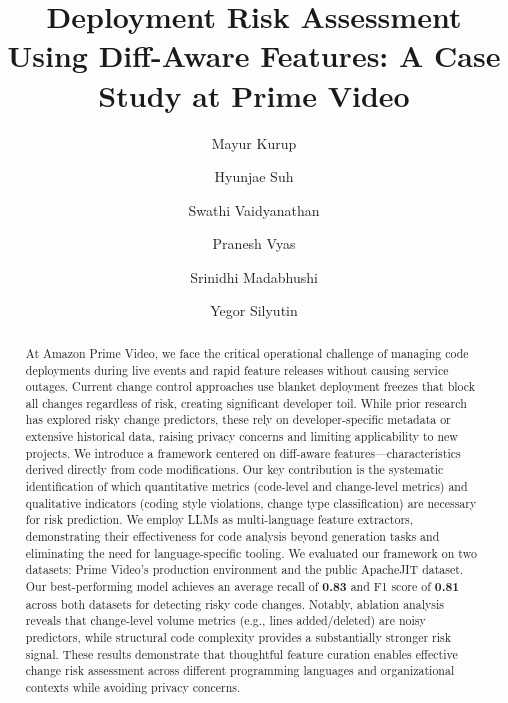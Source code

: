 \documentclass[sigconf,nonacm]{acmart}
\begin{document}
\title{Deployment Risk Assessment Using Diff-Aware Features: A Case Study at Prime Video}

\author{Mayur Kurup}

\author{Hyunjae Suh}
\authornotemark[1]

\author{Swathi Vaidyanathan}


\author{Pranesh Vyas}



\author{Srinidhi Madabhushi}

\author{Yegor Silyutin}

\begin{abstract}
At Amazon Prime Video, we face the critical operational challenge of managing code deployments during live events and rapid feature releases without causing service outages. Current change control approaches use blanket deployment freezes that block all changes regardless of risk, creating significant developer toil. While prior research has explored risky change predictors, these rely on developer-specific metadata or extensive historical data, raising privacy concerns and limiting applicability to new projects. We introduce a framework centered on diff-aware features---characteristics derived directly from code modifications. Our key contribution is the systematic identification of which quantitative metrics (code-level and change-level metrics) and qualitative indicators (coding style violations, change type classification) are necessary for risk prediction. We employ LLMs as multi-language feature extractors, demonstrating their effectiveness for code analysis beyond generation tasks and eliminating the need for language-specific tooling. We evaluated our framework on two datasets: Prime Video's production environment and the public ApacheJIT dataset. Our best-performing model achieves an average recall of \textbf{0.83} and F1 score of \textbf{0.81} across both datasets for detecting risky code changes. Notably, ablation analysis reveals that change-level volume metrics (e.g., lines added/deleted) are noisy predictors, while structural code complexity provides a substantially stronger risk signal. These results demonstrate that thoughtful feature curation enables effective change risk assessment across different programming languages and organizational contexts while avoiding privacy concerns.
\end{abstract}
\end{document}
